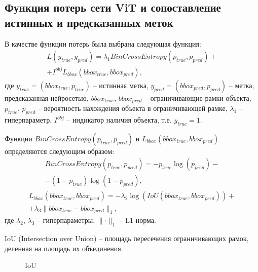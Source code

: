 \documentclass[14pt,a4paper]{extarticle}
\begin{document}
\newpage
\subsection{Функция потерь сети ViT и сопоставление истинных и предсказанных меток}

В качестве функции потерь была выбрана следующая функция:
\begin{multline}
L \left(y_{true}, y_{pred}\right) = \lambda_1 BinCrossEntropy\left(p_{true}, p_{pred}\right) +\\
+I^{obj} L_{bbox} \left(bbox_{true}, bbox_{pred}\right),
\end{multline}
где $y_{true} = (bbox_{true}, p_{true})$ -- истинная метка, $y_{pred} = (bbox_{pred}, p_{pred})$ -- метка, предсказанная нейросетью, $bbox_{true}$, $bbox_{pred}$ -- ограничивающие рамки объекта, $p_{true}$, $p_{pred}$ -- вероятность нахождения объекта в ограничивающей рамке, $\lambda_1$ -- гиперпараметр, $I^{obj}$ -- индикатор наличия объекта, т.е. $y_{true} = 1$. 

Функции $BinCrossEntropy\left(p_{true}, p_{pred}\right)$ и $L_{bbox} \left(bbox_{true}, bbox_{pred}\right)$ определяются следующим образом:
\begin{multline}
BinCrossEntropy\left(p_{true}, p_{pred}\right) = - p_{true} \log(p_{pred}) -\\ - ( 1 - p_{true} ) \log(1 - p_{pred}),
\end{multline}
\begin{multline}
L_{bbox} \left(bbox_{true}, bbox_{pred}\right) = - \lambda_2 \log(IoU\left(bbox_{true}, bbox_{pred}\right)) +\\ + \lambda_3 \parallel bbox_{true} - bbox_{pred}\parallel_1,
\end{multline}
где $\lambda_2$, $\lambda_3$ -- гиперпараметры, $\parallel \cdot \parallel_1$ -- L1 норма.

IoU (Intersection over Union) -- площадь пересечения ограничивающих рамок, деленная на площадь их объединения.
\begin{figure}[h]
\caption{IoU}
\label{IoU}
\end{figure}  
\end{document}
